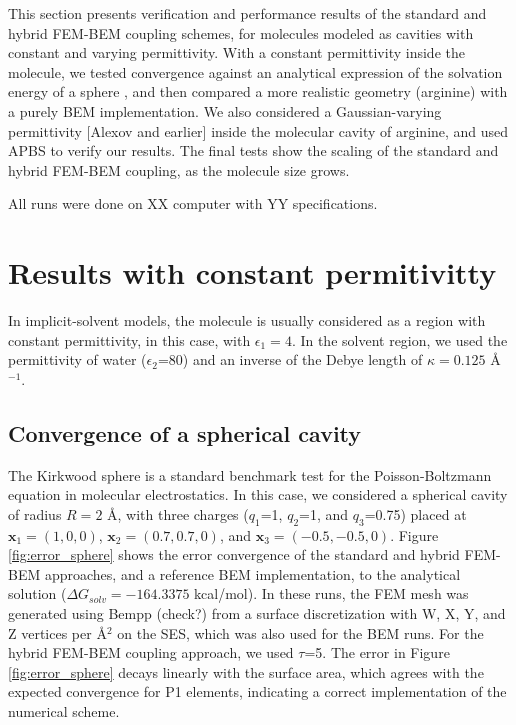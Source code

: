 This section presents verification and performance results of the standard and hybrid FEM-BEM coupling schemes, for molecules modeled as cavities with constant and varying permittivity.
With a constant permittivity inside the molecule, we tested convergence against an analytical expression of the solvation energy of a sphere \cite{Kirkwood1934}, and then compared a more realistic geometry (arginine) with a purely BEM implementation.
We also considered a Gaussian-varying permittivity [Alexov and earlier] inside the molecular cavity of arginine, and used APBS \cite{BakerETal2001} to verify our results.
The final tests show the scaling of the standard and hybrid FEM-BEM coupling, as the molecule size grows. 

All runs were done on XX computer with YY specifications. 

\section*{\sffamily \Large Results with constant permitivitty}

In implicit-solvent models, the molecule is usually considered as a region with constant permittivity, in this case, with $\epsilon_1=4$.
In the solvent region, we used the permittivity of water ($\epsilon_2$=80) and an inverse of the Debye length of $\kappa=0.125$ \AA$^{-1}$.

\subsection*{\sffamily \large Convergence of a spherical cavity}

The Kirkwood sphere \cite{Kirkwood1934} is a standard benchmark test for the Poisson-Boltzmann equation in molecular electrostatics. 
In this case, we considered a spherical cavity of radius $R=2$ \AA, with three charges ($q_1$=1, $q_2$=1, and $q_3$=0.75) placed at $\mathbf{x}_1=(1,0,0)$, $\mathbf{x}_2=(0.7,0.7,0)$, and $\mathbf{x}_3=(-0.5,-0.5,0)$.
Figure \ref{fig:error_sphere} shows the error convergence of the standard and hybrid FEM-BEM approaches, and a reference BEM implementation, to the analytical solution ($\Delta G_{solv}= -164.3375$ kcal/mol). 
In these runs, the FEM mesh was generated using Bempp (check?) from a surface discretization with W, X, Y, and Z vertices per \AA$^2$ on the SES, which was also used for the BEM runs. 
For the hybrid FEM-BEM coupling approach, we used $\tau$=5.
The error in Figure \ref{fig:error_sphere} decays linearly with the surface area, which agrees with the expected convergence for P1 elements, indicating a correct implementation of the numerical scheme. 

